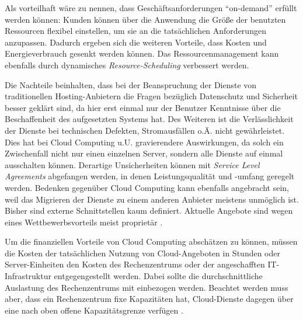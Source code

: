 Als vorteilhaft wäre zu nennen, dass Geschäftsanforderungen \enquote{on-demand} erfüllt werden können: Kunden können über die Anwendung die Größe der benutzten Ressourcen flexibel einstellen, um sie an die tatsächlichen Anforderungen anzupassen. Dadurch ergeben sich die weiteren Vorteile, dass Kosten und Energieverbrauch gesenkt werden können. Das Ressourcenmanagement kann ebenfalls durch dynamisches \textit{Resource-Scheduling} verbessert werden.

Die Nachteile beinhalten, dass bei der Beanspruchung der Dienste von traditionellen Hosting-Anbietern die Fragen bezüglich Datenschutz und Sicherheit besser geklärt sind, da hier erst einmal nur der Benutzer Kenntnisse über die Beschaffenheit des aufgesetzten Systems hat. Des Weiteren ist die Verlässlichkeit der Dienste bei technischen Defekten, Stromausfällen o.Ä. nicht gewährleistet. Dies hat bei Cloud Computing u.U. gravierendere Auswirkungen, da solch ein Zwischenfall nicht nur einen einzelnen Server, sondern alle Dienste auf einmal ausschalten können. Derartige Unsicherheiten können mit \textit{Service Level Agreements} abgefangen werden, in denen Leistungsqualität und -umfang geregelt werden. Bedenken gegenüber Cloud Computing kann ebenfalls angebracht sein, weil das Migrieren der Dienste zu einem anderen Anbieter meistens unmöglich ist. Bisher sind externe Schnittstellen kaum definiert. Aktuelle Angebote sind wegen eines Wettbewerbsvorteils meist proprietär  .

Um die finanziellen Vorteile von Cloud Computing abschätzen zu können, müssen die Kosten der tatsächlichen Nutzung von Cloud-Angeboten in Stunden oder Server-Einheiten den Kosten des Rechenzentrums oder der angeschafften IT-Infrastruktur entgegengestellt werden. Dabei sollte die durchschnittliche Auslastung des Rechenzentrums mit einbezogen werden. Beachtet werden muss aber, dass ein Rechenzentrum fixe Kapazitäten hat, Cloud-Dienste dagegen über eine nach oben offene Kapazitätsgrenze verfügen .